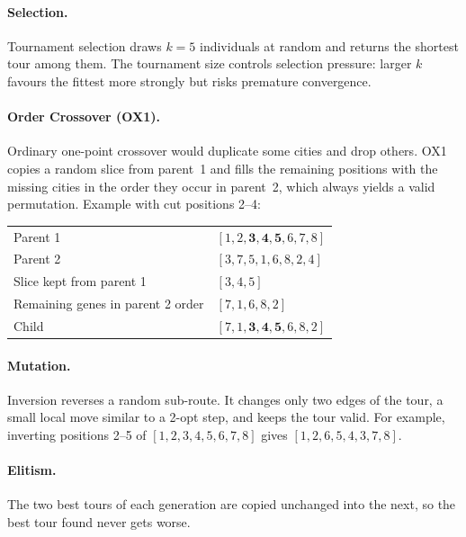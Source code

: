 \documentclass[11pt,a4paper]{article}
\begin{document}
\paragraph{Selection.}
Tournament selection draws $k=5$ individuals at random and returns the shortest tour among them. The tournament
size controls selection pressure: larger $k$ favours the fittest more strongly but risks premature convergence.

\paragraph{Order Crossover (OX1).}
Ordinary one-point crossover would duplicate some cities and drop others. OX1 copies a random slice from parent~1
and fills the remaining positions with the missing cities in the order they occur in parent~2, which always
yields a valid permutation. Example with cut positions 2--4:
\begin{center}
\begin{tabular}{@{}ll@{}}
Parent 1 & $[1,2,\mathbf{3,4,5},6,7,8]$ \\
Parent 2 & $[3,7,5,1,6,8,2,4]$ \\
Slice kept from parent 1 & $[3,4,5]$ \\
Remaining genes in parent 2 order & $[7,1,6,8,2]$ \\
Child & $[7,1,\mathbf{3,4,5},6,8,2]$
\end{tabular}
\end{center}

\paragraph{Mutation.}
Inversion reverses a random sub-route. It changes only two edges of the tour, a small local move similar to a
2-opt step, and keeps the tour valid. For example, inverting positions 2--5 of $[1,2,3,4,5,6,7,8]$ gives
$[1,2,6,5,4,3,7,8]$.

\paragraph{Elitism.}
The two best tours of each generation are copied unchanged into the next, so the best tour found never gets worse.
\end{document}
